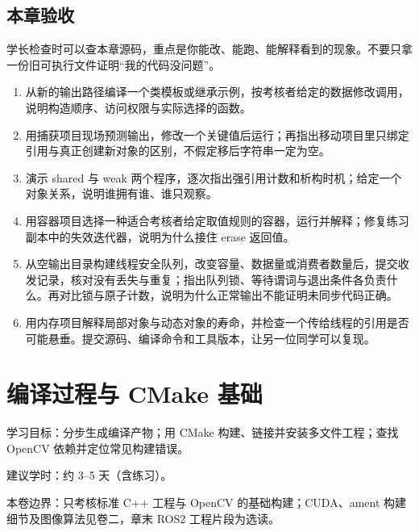 \documentclass[
  lang=cn,
  scheme=chinese,
  chinesefont=ctexfont,
  11pt,
  oneside,
  device=normal,
  color=cyan,
  mode=fancy
]{../templates/elegantbook}
\begin{document}

\section{本章验收}
学长检查时可以查本章源码，重点是你能改、能跑、能解释看到的现象。不要只拿一份旧可执行文件证明“我的代码没问题”。
\begin{enumerate}
    \item 从新的输出路径编译一个类模板或继承示例，按考核者给定的数据修改调用，说明构造顺序、访问权限与实际选择的函数。
    \item 用捕获项目现场预测输出，修改一个关键值后运行；再指出移动项目里只绑定引用与真正创建新对象的区别，不假定移后字符串一定为空。
    \item 演示 shared 与 weak 两个程序，逐次指出强引用计数和析构时机；给定一个对象关系，说明谁拥有谁、谁只观察。
    \item 用容器项目选择一种适合考核者给定取值规则的容器，运行并解释；修复练习副本中的失效迭代器，说明为什么接住 erase 返回值。
    \item 从空输出目录构建线程安全队列，改变容量、数据量或消费者数量后，提交收发记录，核对没有丢失与重复；指出队列锁、等待谓词与退出条件各负责什么。再对比锁与原子计数，说明为什么正常输出不能证明未同步代码正确。
    \item 用内存项目解释局部对象与动态对象的寿命，并检查一个传给线程的引用是否可能悬垂。提交源码、编译命令和工具版本，让另一位同学可以复现。
\end{enumerate}
\endgroup

\chapter{编译过程与 CMake 基础}

\begin{introduction}
  \item 学习目标：分步生成编译产物；用 CMake 构建、链接并安装多文件工程；查找 OpenCV 依赖并定位常见构建错误。
  \item 建议学时：约 3--5 天（含练习）。
  \item 本卷边界：只考核标准 C++ 工程与 OpenCV 的基础构建；CUDA、ament 构建细节及图像算法见卷二，章末 ROS2 工程片段为选读。
\end{introduction}
\end{document}
